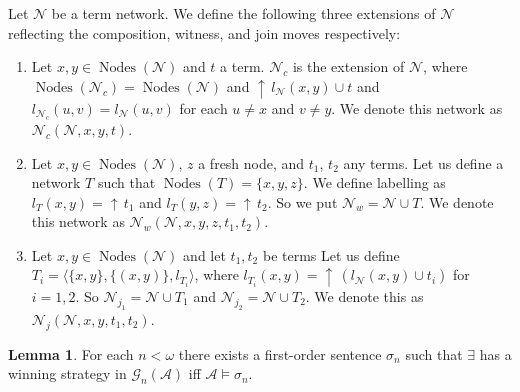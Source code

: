\documentclass[a4paper]{article}
\theoremstyle{definition}
\theoremstyle{theorem}
\theoremstyle{proposition}
\theoremstyle{lemma}
\newtheorem{lemma}{Lemma}
\theoremstyle{ex}
\theoremstyle{corollary}
\theoremstyle{claim}
\newcommand{\up}[1]{\ensuremath{{\uparrow}\,#1}}
\begin{document}
Let $\mathcal{N}$ be a term network. We define the following three extensions of $\mathcal{N}$ reflecting the composition, witness, and join moves respectively:
\begin{enumerate}
  \item Let $x, y \in \operatorname{Nodes}(\mathcal{N})$ and $t$ a term. $\mathcal{N}_c$ is the extension of $\mathcal{N}$,
  where $\operatorname{Nodes}(\mathcal{N}_c) = \operatorname{Nodes}(\mathcal{N})$ and $\up{l_{\mathcal{N}}(x, y) \cup t}$ and $l_{\mathcal{N}_c}(u, v) = l_{\mathcal{N}}(u, v)$ for each $u \neq x$ and $v \neq y$. We denote this network as $\mathcal{N}_c(\mathcal{N}, x, y, t)$.
  \item
  Let $x, y \in \operatorname{Nodes}(\mathcal{N})$, $z$ a fresh node, and $t_1$, $t_2$ any terms. Let us define a network $T$ such that $\operatorname{Nodes}(T) = \{ x, y, z\}$. We define labelling as $l_{T}(x, y) = \up{t_1}$ and $l_{T}(y, z) = \up{t_2}$. So we put $\mathcal{N}_w = \mathcal{N} \cup T$.
  We denote this network as $\mathcal{N}_w(\mathcal{N}, x,y,z, t_1, t_2)$.
  \item Let $x, y \in \operatorname{Nodes}(\mathcal{N})$ and let $t_1, t_2$ be terms
  Let us define $T_i = \langle \{ x, y\}, \{ (x, y) \}, l_{T_i} \rangle$, where $l_{T_i}(x, y) = \up{(l_{\mathcal{N}}(x, y) \cup t_i)}$ for $i = 1,2$. So $\mathcal{N}_{j_1} = \mathcal{N} \cup T_1$ and $\mathcal{N}_{j_2} = \mathcal{N} \cup T_2$.
  We denote this as $\mathcal{N}_j(\mathcal{N}, x, y, t_1, t_2)$.
\end{enumerate}

\begin{lemma}\label{ax}
  For each $n < \omega$ there exists a first-order sentence $\sigma_n$ such that $\exists$ has a winning strategy in $\mathcal{G}_n(\mathcal{A})$ iff $\mathcal{A} \models \sigma_n$.
\end{lemma}
\end{document}
